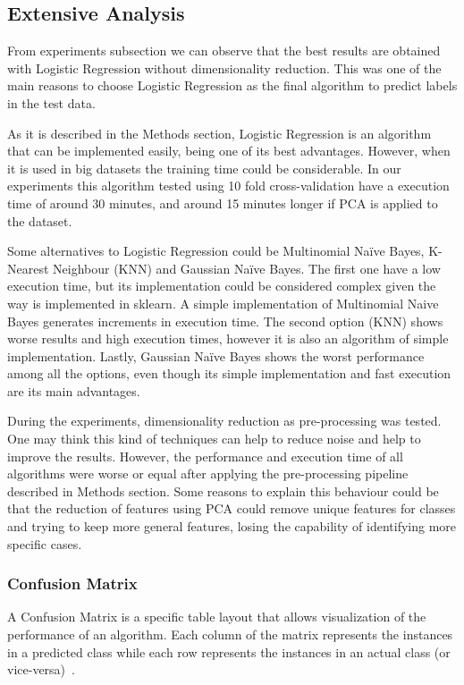 \documentclass[letterpaper,10pt]{article}
\theoremstyle{mytheor}
\begin{document}
\subsection{Extensive Analysis}

From experiments subsection we can observe that the best results are obtained with Logistic Regression without dimensionality reduction. This was one of the main reasons to choose Logistic Regression as the final algorithm to predict labels in the test data. 

As it is described in the Methods section, Logistic Regression is an algorithm that can be implemented easily, being one of its best advantages. However, when it is used in big datasets the training time could be considerable. In our experiments this algorithm tested using 10 fold cross-validation have a execution time of around 30 minutes, and around 15 minutes longer if PCA is applied to the dataset. 

Some alternatives to Logistic Regression could be Multinomial Na\"{i}ve Bayes, K-Nearest Neighbour (KNN) and Gaussian Na\"{i}ve Bayes. The first one have a low execution time, but its implementation could be considered complex given the way is implemented in sklearn. A simple implementation of Multinomial Naive Bayes generates increments in execution time. The second option (KNN) shows worse results and high execution times, however it is also an algorithm of simple implementation. Lastly, Gaussian Na\"{i}ve Bayes shows the worst performance among all the options, even though its simple implementation and fast execution are its main advantages.

During the experiments, dimensionality reduction as pre-processing was tested. One may think this kind of techniques can help to reduce noise and help to improve the results. However, the performance and execution time of all algorithms were worse or equal after applying the pre-processing pipeline described in Methods section. Some reasons to explain this behaviour could be that the reduction of features using PCA could remove unique features for classes and trying to keep more general features, losing the capability of identifying more specific cases.    

\subsubsection{Confusion Matrix}

A Confusion Matrix is a specific table layout that allows visualization of the performance of an algorithm. Each column of the matrix represents the instances in a predicted class while each row represents the instances in an actual class (or vice-versa)~\cite{wiki:confusion}.
\end{document}
